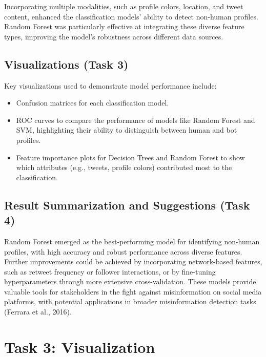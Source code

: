 \documentclass[a4paper,11pt]{article}
\begin{document}
Incorporating multiple modalities, such as profile colors, location, and tweet content, enhanced the classification models' ability to detect non-human profiles. Random Forest was particularly effective at integrating these diverse feature types, improving the model’s robustness across different data sources.

\subsection{Visualizations (Task 3)}

Key visualizations used to demonstrate model performance include:
\begin{itemize}
    \item Confusion matrices for each classification model.
    \item ROC curves to compare the performance of models like Random Forest and SVM, highlighting their ability to distinguish between human and bot profiles.
    \item Feature importance plots for Decision Trees and Random Forest to show which attributes (e.g., tweets, profile colors) contributed most to the classification.
\end{itemize}

\subsection{Result Summarization and Suggestions (Task 4)}

Random Forest emerged as the best-performing model for identifying non-human profiles, with high accuracy and robust performance across diverse features. Further improvements could be achieved by incorporating network-based features, such as retweet frequency or follower interactions, or by fine-tuning hyperparameters through more extensive cross-validation. These models provide valuable tools for stakeholders in the fight against misinformation on social media platforms, with potential applications in broader misinformation detection tasks (Ferrara et al., 2016).











\section{Task 3: Visualization}
\end{document}
